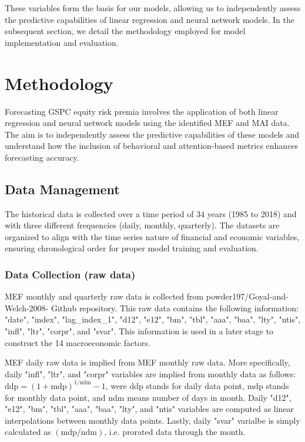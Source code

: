 \documentclass{article}
\begin{document}
These variables form the basis for our models, allowing us to independently assess the predictive capabilities of linear regression and neural network models. In the subsequent section, we detail the methodology employed for model implementation and evaluation.

\newpage

\section{Methodology}

Forecasting GSPC equity risk premia involves the application of both linear regression and neural network models using the identified MEF and MAI data. The aim is to independently assess the predictive capabilities of these models and understand how the inclusion of behavioral and attention-based metrics enhances forecasting accuracy.

\subsection{Data Management}

The historical data is collected over a time period of 34 years (1985 to 2018) and with three different frequencies (daily, monthly, quarterly). The datasets are organized to align with the time series nature of financial and economic variables, ensuring chronological order for proper model training and evaluation.

\subsubsection{Data Collection (raw data)}
  
MEF monthly and quarterly raw data is collected from powder197/Goyal-and-Welch-2008- Github repository. This raw data contains the following information: "date", "index", "lag\_index\_1", "d12", "e12", "bm", "tbl", "aaa", "baa", "lty", "ntis", "infl", "ltr", "corpr", and "svar". This information is used in a later stage to construct the 14 macroeconomic factors.

MEF daily raw data is implied from MEF monthly raw data. More specifically, daily "infl", "ltr", and "corpr" variables are implied from monthly data as follows: $\text{ddp} = (1+\text{mdp})^{1/\text{ndm}}-1$, were $\text{ddp}$ stands for daily data point, $\text{mdp}$ stands for monthly data point, and $\text{ndm}$ means number of days in month. 
Daily "d12", "e12", "bm", "tbl", "aaa", "baa", "lty", and "ntis" variables are computed as linear interpolations between monthly data points. Lastly, daily "svar" varialbe is simply calculated as $(\text{mdp}/\text{ndm})$, i.e. prorated data through the month.
\end{document}
